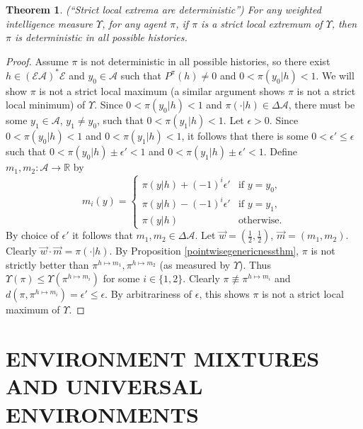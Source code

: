 \documentclass[twoside]{article}
\newtheorem{theorem}{Theorem}
\begin{document}
\begin{theorem}
\label{extremitythm}
    (``Strict local extrema are deterministic'')
    For any weighted intelligence measure $\Upsilon$, for any agent $\pi$,
    if $\pi$ is a strict local extremum of $\Upsilon$, then
    $\pi$ is deterministic in all possible histories.
\end{theorem}

\begin{proof}
    Assume $\pi$ is not deterministic in all possible histories, so there exist
    $h\in(\mathcal E\mathcal A)^*\mathcal E$ and $y_0\in\mathcal A$
    such that $P^\pi(h)\not=0$ and $0<\pi(y_0|h)<1$.
    We will show $\pi$ is not a strict local maximum (a similar argument
    shows $\pi$ is not a strict local minimum) of $\Upsilon$.
    Since $0<\pi(y_0|h)<1$ and $\pi(\cdot|h)\in\Delta\mathcal A$,
    there must be some $y_1\in\mathcal A$, $y_1\not=y_0$, such that
    $0<\pi(y_1|h)<1$. Let $\epsilon>0$.
    Since $0<\pi(y_0|h)<1$ and $0<\pi(y_1|h)<1$, it follows
    that there is some $0<\epsilon'\leq \epsilon$
    such that $0<\pi(y_0|h)\pm\epsilon'<1$ and $0<\pi(y_1|h)\pm\epsilon'<1$.
    Define $m_1,m_2:\mathcal A\to \mathbb R$ by
    \[
        m_i(y) = \begin{cases}
            \pi(y|h)+(-1)^i\epsilon' &\mbox{if $y=y_0$,}\\
            \pi(y|h)-(-1)^i\epsilon' &\mbox{if $y=y_1$,}\\
            \pi(y|h) &\mbox{otherwise.}
        \end{cases}
    \]
    By choice of $\epsilon'$ it follows that $m_1,m_2\in\Delta\mathcal A$.
    Let $\vec w=(\frac12,\frac12)$, $\vec m=(m_1,m_2)$.
    Clearly $\vec w\cdot\vec m=\pi(\cdot|h)$.
    By Proposition \ref{pointwisegenericnessthm},
    $\pi$ is not strictly better than $\pi^{h\mapsto m_1},\pi^{h\mapsto m_2}$
    (as measured by $\Upsilon$).
    Thus $\Upsilon(\pi)\leq \Upsilon(\pi^{h\mapsto m_i})$
    for some $i\in\{1,2\}$.
    Clearly $\pi\not\equiv \pi^{h\mapsto m_i}$
    and $d(\pi,\pi^{h\mapsto m_i})=\epsilon'\leq\epsilon$.
    By arbitrariness of $\epsilon$, this shows
    $\pi$ is not a strict local maximum of $\Upsilon$.
\end{proof}

\section{ENVIRONMENT MIXTURES AND UNIVERSAL ENVIRONMENTS}
\end{document}

